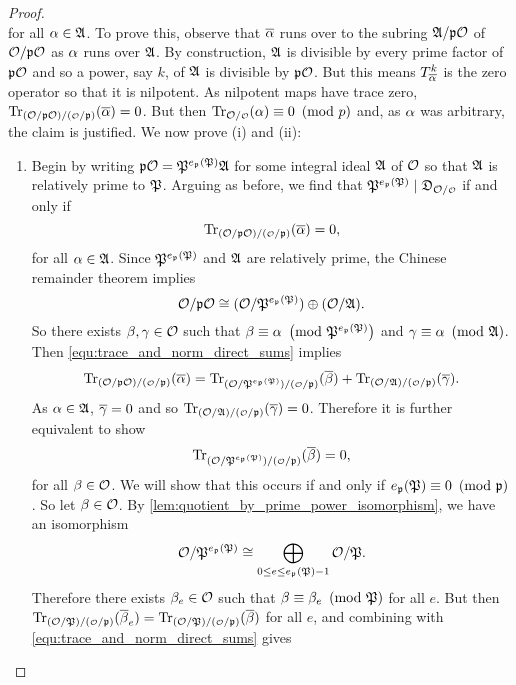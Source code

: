 \begin{proof}
\[      \]
      for all $\alpha \in \mathfrak{A}$. To prove this, observe that $\overline{\alpha}$ runs over to the subring $\mathfrak{A}/\mathfrak{p}\mathcal{O}$ of $\mathcal{O}/\mathfrak{p}\mathcal{O}$ as $\alpha$ runs over $\mathfrak{A}$. By construction, $\mathfrak{A}$ is divisible by every prime factor of $\mathfrak{p}\mathcal{O}$ and so a power, say $k$, of $\mathfrak{A}$ is divisible by $\mathfrak{p}\mathcal{O}$. But this means $T_{\overline{\alpha}}^{k}$ is the zero operator so that it is nilpotent. As nilpotent maps have trace zero, $\Trace_{(\mc{O}/\mf{p}\mc{O})/(\smc{O}/\mf{p})}(\conj{\a}) = 0$. But then $\Trace_{\mc{O}/\smc{O}}(\a) \equiv 0 \tmod{p}$ and, as $\alpha$ was arbitrary, the claim is justified. We now prove (i) and (ii):
      \begin{enumerate}[label=(\roman*)]
        \item Begin by writing $\mathfrak{p}\mathcal{O} = \mathfrak{P}^{e_{\mathfrak{p}}(\mathfrak{P})}\mathfrak{A}$ for some integral ideal $\mathfrak{A}$ of $\mathcal{O}$ so that $\mathfrak{A}$ is relatively prime to $\mathfrak{P}$. Arguing as before, we find that $\mf{P}^{e_{\mf{p}}(\mf{P})} \mid \mf{D}_{\mc{O}/\smc{O}}$ if and only if
        \[
          \Trace_{(\mc{O}/\mf{p}\mc{O})/(\smc{O}/\mf{p})}(\conj{\a}) = 0,
        \]
        for all $\alpha \in \mathfrak{A}$. Since $\mathfrak{P}^{e_{\mathfrak{p}}(\mathfrak{P})}$ and $\mathfrak{A}$ are relatively prime, the Chinese remainder theorem implies
        \[
          \mathcal{O}/\mathfrak{p}\mathcal{O} \cong (\mathcal{O}/\mathfrak{P}^{e_{\mathfrak{p}}(\mathfrak{P})}) \oplus (\mathcal{O}/\mathfrak{A}).
        \]
        So there exists $\beta,\gamma \in \mathcal{O}$ such that $\beta \equiv \alpha \ \left(\text{mod }\mathfrak{P}^{e_{\mathfrak{p}}(\mathfrak{P})}\right)$ and $\gamma \equiv \alpha \ \left(\text{mod }\mathfrak{A}\right)$. Then \cref{equ:trace_and_norm_direct_sums} implies
        \[
          \Trace_{(\mc{O}/\mf{p}\mc{O})/(\smc{O}/\mf{p})}(\conj{\a}) = \Trace_{(\mc{O}/\mf{P}^{e_{\mf{p}}(\mf{P})})/(\smc{O}/\mf{p})}(\conj{\b})+\Trace_{(\mc{O}/\mf{A})/(\smc{O}/\mf{p})}(\conj{\g}).
        \]
        As $\alpha \in \mathfrak{A}$, $\overline{\gamma} = 0$ and so $\Trace_{(\mc{O}/\mf{A})/(\smc{O}/\mf{p})}(\conj{\g}) = 0$. Therefore it is further equivalent to show
        \[
          \Trace_{(\mc{O}/\mf{P}^{e_{\mf{p}}(\mf{P})})/(\smc{O}/\mf{p})}(\conj{\b}) = 0,
        \]
        for all $\beta \in \mathcal{O}$. We will show that this occurs if and only if $e_{\mathfrak{p}}(\mathfrak{P}) \equiv 0 \ \left(\text{mod }\mathfrak{p}\right)$. So let $\beta \in \mathcal{O}$. By \cref{lem:quotient_by_prime_power_isomorphism}, we have an isomorphism
        \[
          \mathcal{O}/\mathfrak{P}^{e_{\mathfrak{p}}(\mathfrak{P})} \cong \bigoplus_{0 \le e \le e_{\mathfrak{p}}(\mathfrak{P})-1}\mathcal{O}/\mathfrak{P}.
        \]
        Therefore there exists $\beta_{e} \in \mathcal{O}$ such that $\beta \equiv \beta_{e} \ \left(\text{mod }\mathfrak{P}\right)$ for all $e$. But then $\Trace_{(\mc{O}/\mf{P})/(\smc{O}/\mf{p})}(\conj{\b}_{e}) = \Trace_{(\mc{O}/\mf{P})/(\smc{O}/\mf{p})}(\conj{\b})$ for all $e$, and combining with \cref{equ:trace_and_norm_direct_sums} gives

\end{enumerate}
\end{proof}
